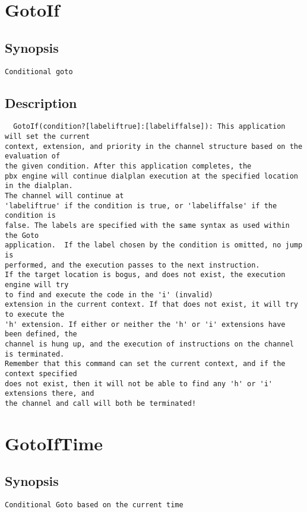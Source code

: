 \section{GotoIf}
\subsection{Synopsis}
\begin{verbatim}
Conditional goto
\end{verbatim}
\subsection{Description}
\begin{verbatim}
  GotoIf(condition?[labeliftrue]:[labeliffalse]): This application will set the current
context, extension, and priority in the channel structure based on the evaluation of
the given condition. After this application completes, the
pbx engine will continue dialplan execution at the specified location in the dialplan.
The channel will continue at
'labeliftrue' if the condition is true, or 'labeliffalse' if the condition is
false. The labels are specified with the same syntax as used within the Goto
application.  If the label chosen by the condition is omitted, no jump is
performed, and the execution passes to the next instruction.
If the target location is bogus, and does not exist, the execution engine will try 
to find and execute the code in the 'i' (invalid)
extension in the current context. If that does not exist, it will try to execute the
'h' extension. If either or neither the 'h' or 'i' extensions have been defined, the
channel is hung up, and the execution of instructions on the channel is terminated.
Remember that this command can set the current context, and if the context specified
does not exist, then it will not be able to find any 'h' or 'i' extensions there, and
the channel and call will both be terminated!

\end{verbatim}


\section{GotoIfTime}
\subsection{Synopsis}
\begin{verbatim}
Conditional Goto based on the current time
\end{verbatim}
